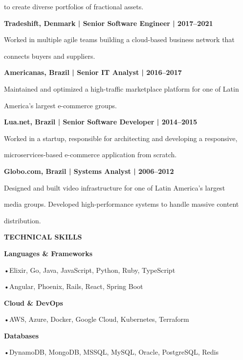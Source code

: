 \documentclass[a4paper]{article}
\newcommand{\bul}[1]{\leavevmode\hspace{18.6pt}•\hspace{4.3pt}#1\par}
\begin{document}
\noindent to create diverse portfolios of fractional assets.\par
\vspace{20pt}
\noindent\textbf{Tradeshift, Denmark | Senior Software Engineer | 2017–2021}\par
\noindent Worked in multiple agile teams building a cloud-based business network that\par
\noindent connects buyers and suppliers.\par
%
\newpage
\vspace*{-42pt}
\noindent\textbf{Americanas, Brazil | Senior IT Analyst | 2016–2017}\par
\noindent Maintained and optimized a high-traffic marketplace platform for one of Latin\par
\noindent America's largest e-commerce groups.\par
\vspace{20pt}
\noindent\textbf{Lua.net, Brazil | Senior Software Developer | 2014–2015}\par
\noindent Worked in a startup, responsible for architecting and developing a responsive,\par
\noindent microservices-based e-commerce application from scratch.\par
\vspace{20pt}
\noindent\textbf{Globo.com, Brazil | Systems Analyst | 2006–2012}\par
\noindent Designed and built video infrastructure for one of Latin America's largest\par
\noindent media groups. Developed high-performance systems to handle massive content\par
\noindent distribution.\par
\vspace{40pt}
\noindent\textbf{TECHNICAL SKILLS}\par
\vspace{20pt}
\noindent\textbf{Languages \& Frameworks}\par
\vspace{20pt}
\bul{Elixir, Go, Java, JavaScript, Python, Ruby, TypeScript}%
\bul{Angular, Phoenix, Rails, React, Spring Boot}%
\vspace{20pt}
\noindent\textbf{Cloud \& DevOps}\par
\vspace{20pt}
\bul{AWS, Azure, Docker, Google Cloud, Kubernetes, Terraform}%
\vspace{20pt}
\noindent\textbf{Databases}\par
\vspace{20pt}
\bul{DynamoDB, MongoDB, MSSQL, MySQL, Oracle, PostgreSQL, Redis}%
\end{document}
